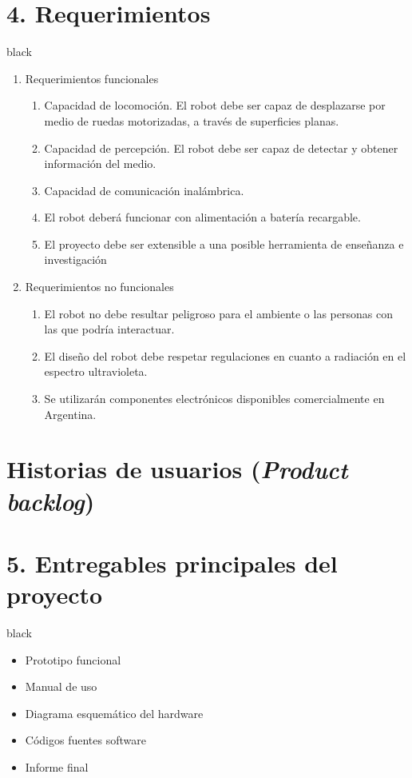 \documentclass[11pt]{charter}
\begin{document}
\section{4. Requerimientos}
\label{sec:requerimientos}
\begin{consigna}{black}
\vspace{-12mm}
\begin{enumerate}
\item Requerimientos funcionales
	\begin{enumerate}
	\item Capacidad de locomoción.  El robot debe ser capaz de desplazarse por medio de ruedas motorizadas, a través de superficies planas.
	\item Capacidad de percepción. El robot debe ser capaz de detectar y obtener información del medio. 
	\item Capacidad de comunicación inalámbrica.
	\item El robot deberá funcionar con alimentación a batería recargable.
	\item El proyecto debe ser extensible a una posible herramienta de enseñanza e investigación

	\end{enumerate}
\item Requerimientos no funcionales
	\begin{enumerate}
	\item El robot no debe resultar peligroso para el ambiente o las personas con las que podría interactuar.
	\item El diseño del robot debe respetar regulaciones en cuanto a radiación en el espectro ultravioleta.
	\item Se utilizarán componentes electrónicos disponibles comercialmente en Argentina.
	\end{enumerate}
\end{enumerate}
\end{consigna}

\section{Historias de usuarios (\textit{Product backlog})}
\label{sec:backlog}


\section{5. Entregables principales del proyecto}
\label{sec:entregables}
\vspace{-12mm}
\begin{consigna}{black}
\begin{itemize}
\item Prototipo funcional
\item Manual de uso
\item Diagrama esquemático del hardware
\item Códigos fuentes software
\item Informe final

\end{itemize}
\end{consigna}
\pagebreak
\end{document}
